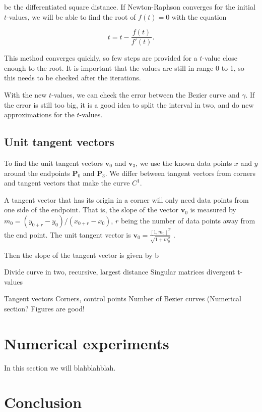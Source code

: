 \documentclass[10pt]{article}
\begin{document}
be the differentiated square distance. If Newton-Raphson converges for the initial $t$-values, we will be able to find the root of $f(t) = 0$ with the equation

\begin{equation}
t = t - \frac{f(t)}{f'(t)}.
\end{equation}

This method converges quickly, so few steps are provided for a $t$-value close enough to the root. It is important that the values are still in range 0 to 1, so this needs to be checked after the iterations. 

With the new $t$-values, we can check the error between the Bezier curve and $\gamma$. If the error is still too big, it is a good idea to split the interval in two, and do new approximations for the $t$-values.

\subsection*{Unit tangent vectors}
To find the unit tangent vectors $\mathbf{v}_0$ and $\mathbf{v}_3$, we use the known data points $x$ and $y$ around the endpoints $\mathbf{P}_0$ and $\mathbf{P}_3$. We differ between tangent vectors from corners and tangent vectors that make the curve $C^1$.

A tangent vector that has its origin in a corner will only need data points from one side of the endpoint. That is, the slope of the vector $\mathbf{v}_0$ is measured by $m_0 = (y_{0+r} - y_0)/(x_{0+r} - x_0)$, $r$ being the number of data points away from the end point. The unit tangent vector is  $\mathbf{v}_0 = \frac{[1, m_0]^T}{\sqrt{1+m_0^2}}$ . 

 Then the slope of the tangent vector is given by b







Divide curve in two, recursive, largest distance
Singular matrices
divergent t-values


Tangent vectors
Corners, control points
Number of Bezier curves (Numerical section?
Figures are good!


\section{Numerical experiments}

In this section we will blahblahblah. 



\section{Conclusion}
\cite{Plass:1983}


\end{document}
